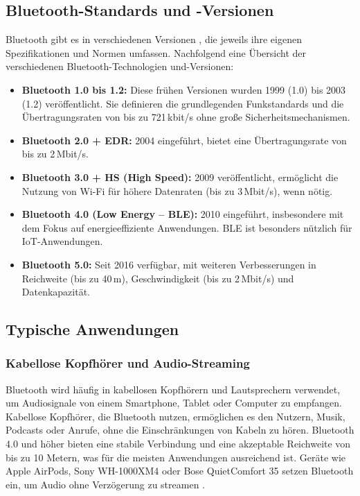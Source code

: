 \subsection{ Bluetooth-Standards und -Versionen}
Bluetooth gibt es in verschiedenen Versionen \cite{Brandao:2018}, die jeweils ihre eigenen Spezifikationen und Normen umfassen. Nachfolgend eine Übersicht der verschiedenen Bluetooth-Technologien und-Versionen: 
\begin{itemize}
	\item \textbf{Bluetooth 1.0 bis 1.2:}  
	Diese frühen Versionen wurden 1999 (1.0) bis 2003 (1.2) veröffentlicht. Sie definieren die grundlegenden Funkstandards und die Übertragungsraten von bis zu 721\,kbit/s ohne große Sicherheitsmechanismen.
	\item \textbf{Bluetooth 2.0 + EDR:}  
	2004 eingeführt, bietet eine Übertragungsrate von bis zu 2\,Mbit/s.
	\item \textbf{Bluetooth 3.0 + HS (High Speed):}  
	2009 veröffentlicht, ermöglicht die Nutzung von Wi-Fi für höhere Datenraten (bis zu 3\,Mbit/s), wenn nötig.
	\item \textbf{Bluetooth 4.0 (Low Energy – BLE):}  
	2010 eingeführt, insbesondere mit dem Fokus auf energieeffiziente Anwendungen. BLE ist besonders nützlich für IoT-Anwendungen.
	\item \textbf{Bluetooth 5.0:}  
	Seit 2016 verfügbar, mit weiteren Verbesserungen in Reichweite (bis zu 40\,m), Geschwindigkeit (bis zu 2\,Mbit/s) und Datenkapazität.
\end{itemize}
\cite{Brandao:2018}

\subsection{Typische Anwendungen}
\subsubsection{Kabellose Kopfhörer und Audio-Streaming}
Bluetooth wird häufig in kabellosen Kopfhörern und Lautsprechern verwendet, um Audiosignale von einem Smartphone, Tablet oder Computer zu empfangen. Kabellose Kopfhörer, die Bluetooth nutzen, ermöglichen es den Nutzern, Musik, Podcasts oder Anrufe, ohne die Einschränkungen von Kabeln zu hören. Bluetooth 4.0 und höher bieten eine stabile Verbindung und eine akzeptable Reichweite von bis zu 10 Metern, was für die meisten Anwendungen ausreichend ist. Geräte wie Apple AirPods, Sony WH-1000XM4 oder Bose QuietComfort 35 setzen Bluetooth ein, um Audio ohne Verzögerung zu streamen \cite{Gaum:2023}.

